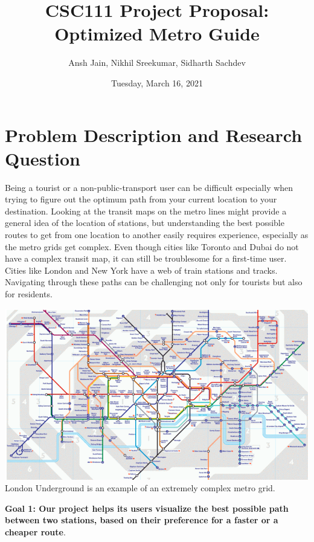 \documentclass[fontsize=11pt]{article}
\title{CSC111 Project Proposal: Optimized Metro Guide}
\author{Ansh Jain, Nikhil Sreekumar, Sidharth Sachdev}
\date{Tuesday, March 16, 2021}
\begin{document}
    \maketitle

    \section*{Problem Description and Research Question}

    Being a tourist or a non-public-transport user can be difficult especially when trying to figure out the optimum path from your current location to your destination. Looking at the transit maps on the metro lines might provide a general idea of the location of stations, but understanding the best possible routes to get from one location to another easily requires experience, especially as the metro grids get complex. Even though cities like Toronto and Dubai do not have a complex transit map, it can still be troublesome for a first-time user. Cities like London and New York have a web of train stations and tracks. Navigating through these paths can be challenging not only for tourists but also for residents.\newline


    \begin{center}
        \includegraphics[width = 14cm]{London Transit Map.png}\newline
        London Underground is an example of an extremely complex metro grid.
    \end{center}

    \textbf{Goal 1: Our project helps its users visualize the best possible path between two stations, based on their preference for a faster or a cheaper route}.\newline
\end{document}
